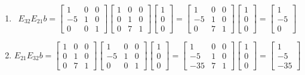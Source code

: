 \begin{enumerate}
	      \begin{enumerate}
		      \item
		            \begin{equation*}
			            E_{32}E_{21}b=\begin{bmatrix} 1& 0& 0\\ -5& 1& 0 \\0& 0& 1 \end{bmatrix}\begin{bmatrix} 1& 0& 0\\ 0& 1& 0 \\0& 7&1 \end{bmatrix}\begin{bmatrix}
				            1 \\0\\0
			            \end{bmatrix}=\begin{bmatrix} 1& 0& 0\\ -5& 1& 0 \\0& 7&1 \end{bmatrix}\begin{bmatrix}
				            1 \\0\\0
			            \end{bmatrix} =\begin{bmatrix}
				            1 \\-5\\0
			            \end{bmatrix}
		            \end{equation*}

		      \item

		            \begin{equation*}
			            E_{21}E_{32}b=\begin{bmatrix} 1& 0& 0\\ 0& 1& 0 \\0& 7&1 \end{bmatrix}\begin{bmatrix} 1& 0& 0\\ -5& 1& 0 \\0& 0& 1 \end{bmatrix}\begin{bmatrix}
				            1 \\0\\0
			            \end{bmatrix}=\begin{bmatrix} 1& 0& 0\\ -5& 1& 0 \\-35& 7&1 \end{bmatrix}\begin{bmatrix}
				            1 \\0\\0
			            \end{bmatrix} = \begin{bmatrix}
				            1 \\-5\\-35
			            \end{bmatrix}
		            \end{equation*}


\end{enumerate}
\end{enumerate}
